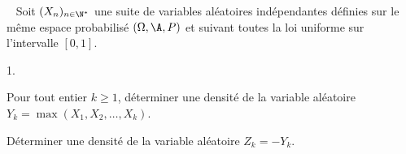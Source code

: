 \documentclass[11pt]{article}%
\begin{document}
\begin{exerciceSP}~
  Soit $(X_n)_{n\in\N^*}$ une suite de variables aléatoires
  indépendantes définies sur le même espace probabilisé
  $(\Omega,\A,P)$ et suivant toutes la loi uniforme sur l'intervalle
  $[0,1]$.
  \begin{noliste}{1.}
    \setlength{\itemsep}{2mm}
  \item Pour tout entier $k\geq 1$, déterminer une densité de la
    variable aléatoire $Y_k=\max(X_1,X_2,\hdots,X_k)$.
  \item Déterminer une densité de la variable aléatoire $Z_k=-Y_k$.
  \end{noliste}
\end{exerciceSP}




\end{document}
